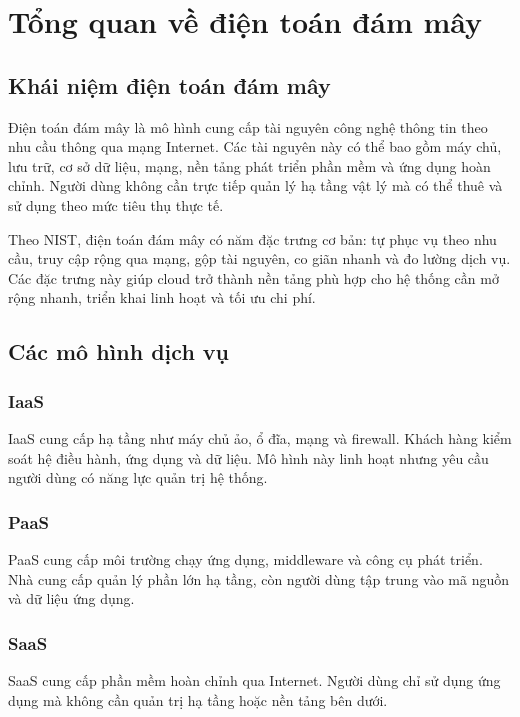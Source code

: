 \chapter{Tổng quan về điện toán đám mây}

\section{Khái niệm điện toán đám mây}
Điện toán đám mây là mô hình cung cấp tài nguyên công nghệ thông tin theo nhu cầu thông qua mạng Internet. Các tài nguyên này có thể bao gồm máy chủ, lưu trữ, cơ sở dữ liệu, mạng, nền tảng phát triển phần mềm và ứng dụng hoàn chỉnh. Người dùng không cần trực tiếp quản lý hạ tầng vật lý mà có thể thuê và sử dụng theo mức tiêu thụ thực tế.

Theo NIST, điện toán đám mây có năm đặc trưng cơ bản: tự phục vụ theo nhu cầu, truy cập rộng qua mạng, gộp tài nguyên, co giãn nhanh và đo lường dịch vụ. Các đặc trưng này giúp cloud trở thành nền tảng phù hợp cho hệ thống cần mở rộng nhanh, triển khai linh hoạt và tối ưu chi phí.

\section{Các mô hình dịch vụ}
\subsection{IaaS}
IaaS cung cấp hạ tầng như máy chủ ảo, ổ đĩa, mạng và firewall. Khách hàng kiểm soát hệ điều hành, ứng dụng và dữ liệu. Mô hình này linh hoạt nhưng yêu cầu người dùng có năng lực quản trị hệ thống.

\subsection{PaaS}
PaaS cung cấp môi trường chạy ứng dụng, middleware và công cụ phát triển. Nhà cung cấp quản lý phần lớn hạ tầng, còn người dùng tập trung vào mã nguồn và dữ liệu ứng dụng.

\subsection{SaaS}
SaaS cung cấp phần mềm hoàn chỉnh qua Internet. Người dùng chỉ sử dụng ứng dụng mà không cần quản trị hạ tầng hoặc nền tảng bên dưới.


